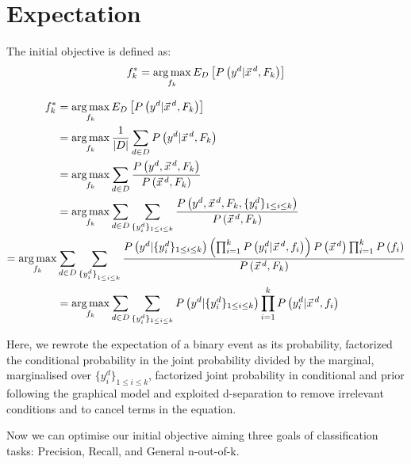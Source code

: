 \section{Expectation}
The initial objective is defined as:
\[f_k^*=\argmax_{f_k}E_D\left[P\left(y^d|\vec{x}^{\,d},F_k\right)\right]\]

\begin{align}
f_k^*&=\argmax_{f_k}E_D\left[P\left(y^d|\vec{x}^{\,d},F_k\right)\right]\nonumber\\
&=\argmax_{f_k}\frac{1}{|D|}\sum_{d\in D} P\left(y^d | \vec{x}^{\,d},F_k\right)\nonumber\\
&=\argmax_{f_k}\sum_{d\in D}\frac{P\left(y^d,\vec{x}^{\,d},F_k\right)}{P\left(\vec{x}^{\,d},F_k\right)}\nonumber\\
&=\argmax_{f_k}\sum_{d\in D}\sum_{\{y_{i}^d\}_{1\leq i\leq k}}\frac{P\left(y^d,\vec{x}^{\,d},F_k,\{y_{i}^d\}_{1\leq i\leq k}\right)}{P\left(\vec{x}^{\,d},F_k\right)}\nonumber\\
=\argmax_{f_k}&\sum_{d \in D}\sum_{{\{y_{i}^d\}}_{1\leq i\leq k}}\frac{P\left(y^d|\{y^d_i\}_{1\leq i\leq k}\right)\left(\prod_{i=1}^kP\left(y_i^d|\vec{x}^{\,d}, f_i\right)\right)P\left(\vec{x}^{\,d}\right)\prod_{i=1}^kP\left(f_i\right)}{P\left(\vec{x}^{\,d},F_k\right)}\nonumber\\
&=\argmax_{f_k}\sum_{d\in D}\sum_{\{y_i^d\}_{1\leq i\leq k}}P\left(y^d|\{y^d_i\}_{1\leq i\leq k}\right)\prod_{i=1}^kP\left(y_i^d|\vec{x}^{\,d},f_i\right)\label{eq:expect}
\end{align}

Here, we rewrote the expectation of a binary event as its probability, factorized the conditional probability in the joint probability divided by the marginal, marginalised over $\{y^d_i\}_{1\leq i\leq k}$, factorized joint probability in conditional and prior following the graphical model and exploited d-separation to remove irrelevant conditions and to cancel terms in the equation.

Now we can optimise our initial objective aiming three goals of classification tasks: Precision, Recall, and General n-out-of-k.

